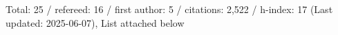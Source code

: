 Total: 25 / refereed: 16 / first author: 5 / citations: 2,522 / h-index: 17 (Last updated: 2025-06-07), List attached below